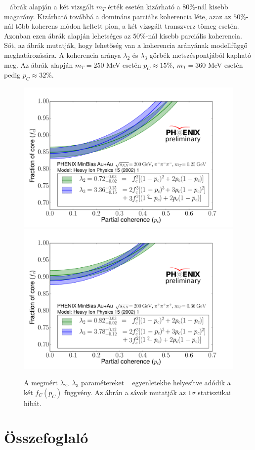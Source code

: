 \documentclass[11pt,a4paper]{article}
\numberwithin{equation}{subsection}
\numberwithin{figure}{section}
\begin{document}
~ ábrák alapján a két vizsgált $m_T$ érték esetén kizárható a $80\%$-nál kisebb magarány. Kizárható továbbá a domináns parciális koherencia léte, azaz az $50\%$-nál több koherens módon keltett pion, a két vizsgált transzverz tömeg esetén. Azonban ezen ábrák alapján lehetséges az $50\%$-nál kisebb parciális koherencia. Sőt, az ábrák mutatják, hogy lehetőség van a koherencia arányának modellfüggő meghatározására. A koherencia aránya $\lambda_2$ és $\lambda_3$ görbék metszéspontjából kapható meg. Az ábrák alapján $m_T=250$ MeV esetén $p_C\approx 15\%$, $m_T=360$ MeV esetén pedig $p_C\approx 32\%$.

\begin{figure}[H]
\centering
\includegraphics[scale=0.5]{pic/res/fcpc1.pdf}
\includegraphics[scale=0.5]{pic/res/fcpc2.pdf}
\caption{A megmért $\lambda_2,\;\lambda_3$ paramétereket ~ egyenletekbe helyesítve adódik a két $f_C(p_C)$ függvény. Az ábrán a sávok mutatják az $1\sigma$ statisztikai hibát.}
\label{fig:fcpc}
\end{figure}

\section{Összefoglaló}





\end{document}
